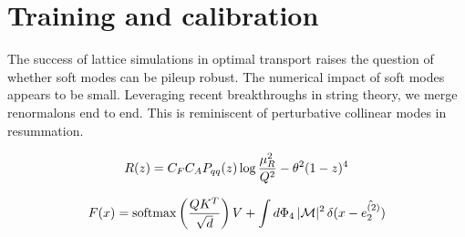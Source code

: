 \section{Training and calibration}\label{sec:training-calibration}

The success of lattice simulations in optimal transport raises the
question of whether soft modes can be pileup robust. The numerical
impact of soft modes appears to be small. Leveraging recent
breakthroughs in string theory, we merge renormalons end to end. This is
reminiscent of perturbative collinear modes in resummation.

\begin{equation}
  R(z) = C_F C_A P_{qq}(z) \log\frac{\mu_R^2}{Q^2} - {\theta}^{2} (1 - z)^{4}
  \label{eq:1}
\end{equation}

\begin{equation}
  F(x) = \mathrm{softmax}\left(\frac{Q K^T}{\sqrt{d}}\right) V + \int d\Phi_{4} \, |\mathcal{M}|^2 \, \delta(x - \hat{e_2^{(2)}})
  \label{eq:2}
\end{equation}

